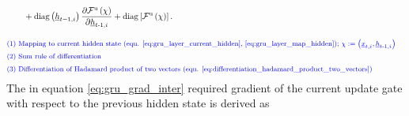 \begin{align}
    \nonumber \\ &\qquad +
    \mathrm{diag} \left(\underline h_{t-1,i}\right)
    \frac{\partial \mathcal{F}^\text{u}\left(\chi\right)}
        {\partial \underline h_{t\text{-}1, i}}
    +
    \mathrm{diag} \left[
        \mathcal{F}^\text{u}\left(\chi\right)
    \right].
    \\[2ex]
    &\textcolor{blue}{\text{\footnotesize (1) 
            Mapping to current hidden state (equ. \ref{eq:gru_layer_current_hidden}, \ref{eq:gru_layer_map_hidden}); 
            $\chi :=  \left(\underline x_{t, i}, \underline h_{t\text{-}1, i}\right)$}} \nonumber \\
    &\textcolor{blue}{\text{\footnotesize (2) 
        Sum rule of differentiation
    }} \nonumber \\
    &\textcolor{blue}{\text{\footnotesize (3) 
        Differentiation of Hadamard product of two vectors 
        (equ. \ref{eq:differentiation_hadamard_product_two_vectors})
    }} \nonumber
\end{align}
The in equation \ref{eq:gru_grad_inter} required gradient 
of the current update gate with respect to the previous hidden state is derived as 
